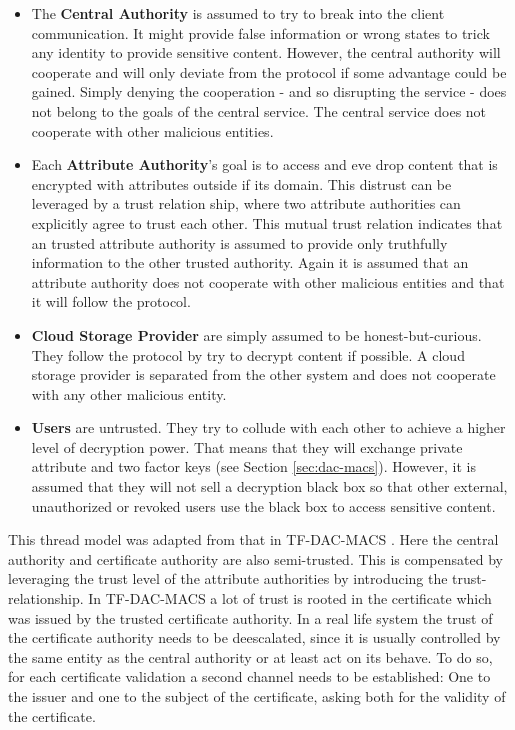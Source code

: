 \begin{itemize}
	\item The \textbf{Central Authority} is assumed to try to break into the client communication. It might provide false information or wrong states to trick any identity to provide sensitive content. However, the central authority will cooperate and will only deviate from the protocol if some advantage could be gained. Simply denying the cooperation - and so disrupting the service - does not belong to the goals of the central service. The central service does not cooperate with other malicious entities. 
	\item Each \textbf{Attribute Authority}’s goal is to access and eve drop content that is encrypted with attributes outside if its domain. This distrust can be leveraged by a trust relation ship, where two attribute authorities can explicitly agree to trust each other. This mutual trust relation indicates that an trusted attribute authority is assumed to provide only truthfully information to the other trusted authority. Again it is assumed that an attribute authority does not cooperate with other malicious entities and that it will follow the protocol.
	\item \textbf{Cloud Storage Provider} are simply assumed to be honest-but-curious. They follow the protocol by try to decrypt content if possible. A cloud storage provider is separated from the other system and does not cooperate with any other malicious entity.  
	\item \textbf{Users} are untrusted. They try to collude with each other to achieve a higher level of decryption power. That means that they will exchange private attribute and two factor keys (see Section \ref{sec:dac-macs}). However, it is assumed that they will not sell a decryption black box so that other external, unauthorized or revoked users use the black box to access sensitive content. 
\end{itemize}

This thread model was adapted from that in TF-DAC-MACS \cite{li2017two}. Here the central authority and certificate authority are also semi-trusted. This is compensated by leveraging the trust level of the attribute authorities by introducing the trust-relationship. In TF-DAC-MACS a lot of trust is rooted in the certificate which was issued by the trusted certificate authority. In a real life system the trust of the certificate authority needs to be deescalated, since it is usually controlled by the same entity as the central authority or at least act on its behave. To do so, for each certificate validation a second channel needs to be established: One to the issuer and one to the subject of the certificate, asking both for the validity of the certificate. 


